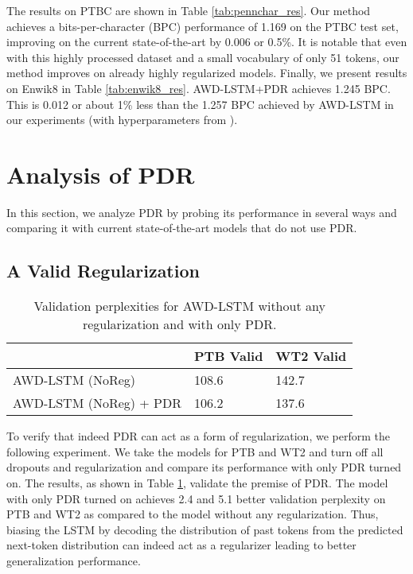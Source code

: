 \documentclass{article} \usepackage{iclr2019_conference,times}
\begin{document}
The results on PTBC are shown in Table \ref{tab:pennchar_res}. Our method achieves a bits-per-character (BPC) performance of 1.169 on the PTBC test set, improving on the current state-of-the-art by 0.006 or 0.5\%. It is notable that even with this highly processed dataset and a small vocabulary of only 51 tokens, our method  improves on already highly regularized models. 
Finally, we present  results on Enwik8 in Table \ref{tab:enwik8_res}. AWD-LSTM+PDR achieves 1.245 BPC. This is 0.012 or about 1\% less than the 1.257 BPC achieved by AWD-LSTM  in our experiments (with hyperparameters from \cite{Merity2018AnAO}).



\section{Analysis of PDR}
\label{sec:analysis}

In this section, we analyze PDR by probing its performance in several ways and comparing it with current state-of-the-art models that do not use PDR. 

\subsection{A Valid Regularization}


\begin{table}[h!]
		\centering
		\begin{tabular}{lll}
			\toprule
			          & PTB Valid & WT2 Valid \\
			\midrule
			AWD-LSTM (NoReg)    & 108.6     & 142.7 \\
			AWD-LSTM (NoReg) + PDR  & 106.2      & 137.6 \\
			\bottomrule
		\end{tabular}
		\caption{Validation perplexities for AWD-LSTM without any regularization and with only PDR. }
		\label{lab:tab_noreg}
		\end{table}

To verify that indeed PDR can act as a form of regularization, we perform the following experiment. We take the models for PTB and WT2 and turn off all dropouts and regularization and compare its performance with only PDR turned on. The results, as shown in Table \ref{lab:tab_noreg}, validate the premise of PDR. The model with only PDR turned on achieves 2.4 and 5.1 better validation perplexity on PTB and WT2 as compared to the model without any regularization. Thus, biasing the LSTM by decoding the distribution of past tokens from the predicted next-token distribution can indeed act as a regularizer leading to better generalization performance.  
\end{document}

